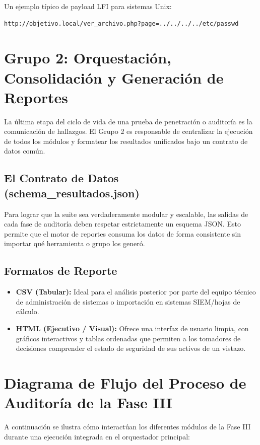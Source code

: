 \documentclass[12pt,letterpaper]{article}
\begin{document}
Un ejemplo típico de payload LFI para sistemas Unix:
\begin{lstlisting}
http://objetivo.local/ver_archivo.php?page=../../../../etc/passwd
\end{lstlisting}

\section{Grupo 2: Orquestación, Consolidación y Generación de Reportes}
La última etapa del ciclo de vida de una prueba de penetración o auditoría es la comunicación de hallazgos. El Grupo 2 es responsable de centralizar la ejecución de todos los módulos y formatear los resultados unificados bajo un contrato de datos común.

\subsection{El Contrato de Datos (schema\_resultados.json)}
Para lograr que la suite sea verdaderamente modular y escalable, las salidas de cada fase de auditoría deben respetar estrictamente un esquema JSON. Esto permite que el motor de reportes consuma los datos de forma consistente sin importar qué herramienta o grupo los generó.

\subsection{Formatos de Reporte}
\begin{itemize}
    \item \textbf{CSV (Tabular):} Ideal para el análisis posterior por parte del equipo técnico de administración de sistemas o importación en sistemas SIEM/hojas de cálculo.
    \item \textbf{HTML (Ejecutivo / Visual):} Ofrece una interfaz de usuario limpia, con gráficos interactivos y tablas ordenadas que permiten a los tomadores de decisiones comprender el estado de seguridad de sus activos de un vistazo.
\end{itemize}

\section{Diagrama de Flujo del Proceso de Auditoría de la Fase III}
A continuación se ilustra cómo interactúan los diferentes módulos de la Fase III durante una ejecución integrada en el orquestador principal:
\end{document}
